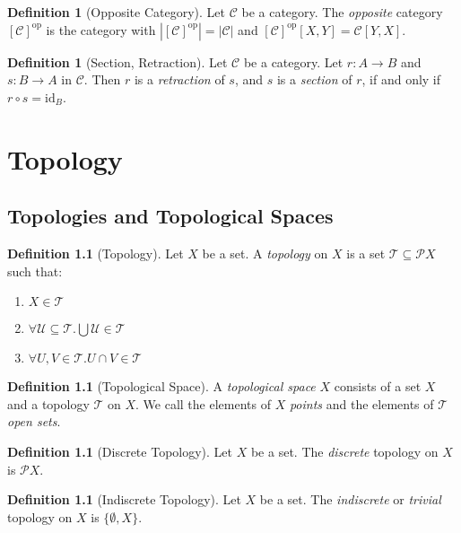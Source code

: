 \documentclass{book}
\theoremstyle{definition}
\newtheorem{definition}[lemma]{Definition}
\newcommand{\CC}{\ensuremath{\mathcal{C}}}
\newcommand{\PP}{\ensuremath{\mathcal{P}}}
\newcommand{\TT}{\ensuremath{\mathcal{T}}}
\newcommand{\id}[1]{\ensuremath{\mathrm{id}_{#1}}}
\newcommand{\op}[1]{\ensuremath{[#1]^{\mathrm{op}}}}
\newcommand{\pow}[1]{\ensuremath{\PP {#1}}}
\begin{document}
\begin{definition}[Opposite Category]
    Let $\CC$ be a category. The \emph{opposite} category $\op{\CC}$ is the category with
    $|\op{\CC}| = |\CC|$ and $\op{\CC}[X,Y] = \CC[Y,X]$.
\end{definition}

\begin{definition}[Section, Retraction]
    Let $\CC$ be a category.
    Let $r : A \rightarrow B$ and $s : B \rightarrow A$ in $\CC$. Then $r$ is a \emph{retraction} of $s$,
    and $s$ is a \emph{section} of $r$, if and only if $r \circ s = \id{B}$.
\end{definition}

\chapter{Topology}

\section{Topologies and Topological Spaces}

\begin{definition}[Topology]
    Let $X$ be a set. A \emph{topology} on $X$ is a set $\TT \subseteq \pow{X}$
    such that:
    \begin{enumerate}
        \item $X \in \TT$
        \item $\forall \mathcal{U} \subseteq \TT. \bigcup \mathcal{U} \in \TT$
        \item $\forall U,V \in \TT. U \cap V \in \TT$
    \end{enumerate}
\end{definition}

\begin{definition}[Topological Space]
    A \emph{topological space} $X$ consists of a set $X$ and a topology $\TT$ on $X$.
    We call the elements of $X$ \emph{points} and the elements of $\TT$ \emph{open sets}.
\end{definition}

\begin{definition}[Discrete Topology]
    Let $X$ be a set. The \emph{discrete} topology on $X$ is $\pow{X}$.
\end{definition}

\begin{definition}[Indiscrete Topology]
    Let $X$ be a set. The \emph{indiscrete} or \emph{trivial} topology on $X$ is $\{ \emptyset, X \}$.
\end{definition}
\end{document}
